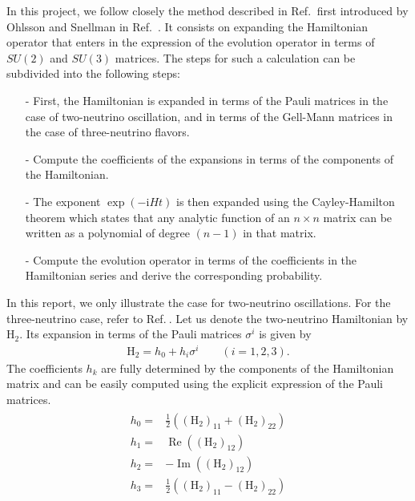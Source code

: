 \documentclass[twocolumn,secnumarabic,amssymb, nobibnotes, aps, prd,10pt]{revtex4-1}
\newcommand{\myref}[1]{Ref.$\:$\cite{#1}}
\begin{document}
In this project, we follow closely the method described in \myref{Bustamante:2019ggq} first 
introduced by Ohlsson and Snellman in Ref.~\cite{Ohlsson:1999xb, Ohlsson:1999um, Ohlsson:2001et}. 
It consists on expanding the Hamiltonian operator that enters in the expression of the evolution 
operator in terms of $SU(2)$ and $SU(3)$ matrices. The steps for such a calculation can be 
subdivided into the following steps:
\begin{itemize}
\item[-] First, the Hamiltonian is expanded in terms of the Pauli matrices in the case of
two-neutrino oscillation, and in terms of the Gell-Mann matrices in the case of 
three-neutrino flavors.
\item[-] Compute the coefficients of the expansions in terms of the components of the
Hamiltonian.
\item[-] The exponent $\exp (-\mathrm{i} H t)$ is then expanded using the Cayley-Hamilton theorem
which states that any analytic function of an $n \times n$ matrix can be written as a 
polynomial of degree $(n-1)$ in that matrix.
\item[-] Compute the evolution operator in terms of the coefficients in the Hamiltonian
series and derive the corresponding probability.
\end{itemize}
In this report, we only illustrate the case for two-neutrino oscillations. For the 
three-neutrino case, refer to \myref{Bustamante:2019ggq}. Let us denote the two-neutrino Hamiltonian
by $\mathrm{H}_2$. Its expansion in terms of the Pauli matrices $\sigma^i$ is given by
\begin{align}
\mathrm{H}_2 = h_0 + h_i \sigma^i \quad \quad (i=1,2,3).
\end{align}
The coefficients $h_k$ are fully determined by the components of the Hamiltonian matrix
and can be easily computed using the explicit expression of the Pauli matrices.
\begin{align}
\begin{array}{ll}
h_{0} =& \frac{1}{2}\left(\left(\mathrm{H}_{2}\right)_{11}+\left(\mathrm{H}_{2}\right)_{22}\right) \\
h_{1} =& \operatorname{Re}\left(\left(\mathrm{H}_{2}\right)_{12}\right) \\
h_{2} =& -\operatorname{Im}\left(\left(\mathrm{H}_{2}\right)_{12}\right) \\
h_{3} =& \frac{1}{2}\left(\left(\mathrm{H}_{2}\right)_{11}-\left(\mathrm{H}_{2}\right)_{22}\right)
\end{array}
\end{align}
\end{document}
